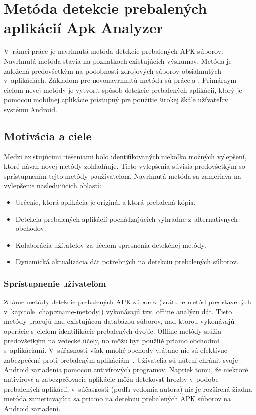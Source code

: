 \chapter{Metóda detekcie prebalených aplikácií Apk Analyzer}
\label{chap:metoda-detekcie-apk-analyzer}
V~rámci práce je navrhnutá metóda detekcie prebalených APK súborov. Navrhnutá metóda stavia na poznatkoch existujúcich výskumov. Metóda je založená predovšetkým na podobnosti zdrojových súborov obsiahnutých v~aplikáciách. Základom pre novonavrhnutú metódu sú práce  a . Primárnym cieľom novej metódy je vytvoriť spôsob detekcie prebalených aplikácií, ktorý je pomocou mobilnej aplikácie prístupný pre použitie širokej škále užívateľov systému Android.

\section{Motivácia a ciele}

Medzi existujúcimi riešeniami bolo identifikovaných niekoľko možných vylepšení, ktoré návrh novej metódy zohľadňuje. Tieto vylepšenia súvisia predovšetkým so sprístupnením tejto metódy používateľom.  Navrhnutá metóda sa zameriava na vylepšenie nasledujúcich oblastí:
\begin{itemize}
	\item Určenie, ktorá aplikácia je originál a ktorá prebalená kópia.
	\item Detekcia prebalených aplikácií pochádzajúcich výhradne z~alternatívnych obchodov.
	\item Kolaborácia užívateľov za účelom spresnenia detekčnej metódy.
	\item Dynamická aktualizácia dát potrebných na detekciu prebalených súborov.
\end{itemize}

\subsection*{Sprístupnenie užívateľom}

Známe metódy detekcie prebalených APK súborov (vrátane metód predstavených v~kapitole \ref{chap:zname-metody}) vykonávajú tzv. offline analýzu dát. Tieto metódy pracujú nad existujúcou databázou súborov, nad ktorou vykonávajú operácie s~cieľom identifikácie prebalených dvojíc. Offline metódy slúžia predovšetkým na vedecké účely, no môžu byť použité priamo obchodmi s~aplikáciami. V~súčasnosti však mnohé obchody vrátane  nie sú efektívne zabezpečené proti prebaleným aplikáciám~\cite{Zhauniarovich2013}. Užívatelia sú nútení chrániť svoje Android zariadenia pomocou antivírových programov. Napriek tomu, že niektoré antivírové a zabezpečovacie aplikácie môžu detekovať hrozby v~podobe prebalených aplikácií, v~súčasnosti (podľa vedomia autora) nie je rozšírená žiadna metóda zameriavajúca sa priamo na detekciu prebalených APK súborov na Android zariadení.

